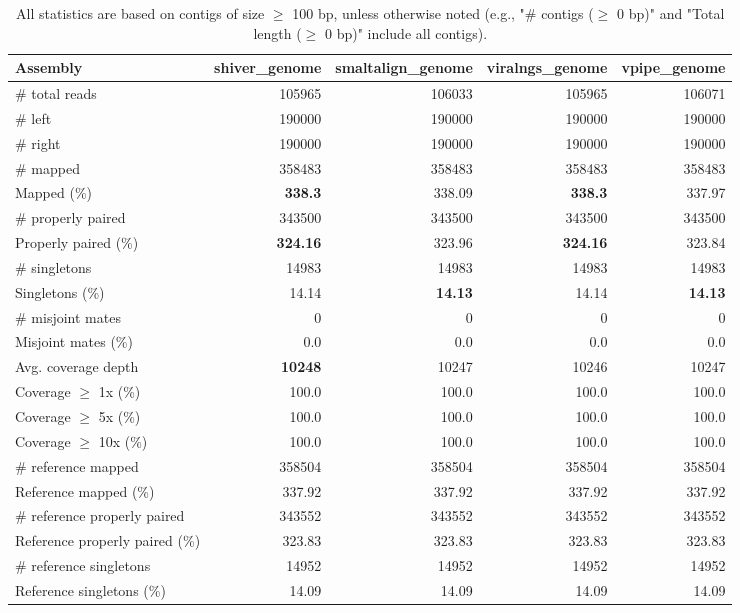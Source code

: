 \documentclass[12pt,a4paper]{article}
\begin{document}
\begin{table}[ht]
\begin{center}
\caption{All statistics are based on contigs of size $\geq$ 100 bp, unless otherwise noted (e.g., "\# contigs ($\geq$ 0 bp)" and "Total length ($\geq$ 0 bp)" include all contigs).}
\begin{tabular}{|l*{4}{|r}|}
\hline
Assembly & shiver\_genome & smaltalign\_genome & viralngs\_genome & vpipe\_genome \\ \hline
\# total reads & 105965 & 106033 & 105965 & 106071 \\ \hline
\# left & 190000 & 190000 & 190000 & 190000 \\ \hline
\# right & 190000 & 190000 & 190000 & 190000 \\ \hline
\# mapped & 358483 & 358483 & 358483 & 358483 \\ \hline
Mapped (\%) & {\bf 338.3} & 338.09 & {\bf 338.3} & 337.97 \\ \hline
\# properly paired & 343500 & 343500 & 343500 & 343500 \\ \hline
Properly paired (\%) & {\bf 324.16} & 323.96 & {\bf 324.16} & 323.84 \\ \hline
\# singletons & 14983 & 14983 & 14983 & 14983 \\ \hline
Singletons (\%) & 14.14 & {\bf 14.13} & 14.14 & {\bf 14.13} \\ \hline
\# misjoint mates & 0 & 0 & 0 & 0 \\ \hline
Misjoint mates (\%) & 0.0 & 0.0 & 0.0 & 0.0 \\ \hline
Avg. coverage depth & {\bf 10248} & 10247 & 10246 & 10247 \\ \hline
Coverage $\geq$ 1x (\%) & 100.0 & 100.0 & 100.0 & 100.0 \\ \hline
Coverage $\geq$ 5x (\%) & 100.0 & 100.0 & 100.0 & 100.0 \\ \hline
Coverage $\geq$ 10x (\%) & 100.0 & 100.0 & 100.0 & 100.0 \\ \hline
\# reference mapped & 358504 & 358504 & 358504 & 358504 \\ \hline
Reference mapped (\%) & 337.92 & 337.92 & 337.92 & 337.92 \\ \hline
\# reference properly paired & 343552 & 343552 & 343552 & 343552 \\ \hline
Reference properly paired (\%) & 323.83 & 323.83 & 323.83 & 323.83 \\ \hline
\# reference singletons & 14952 & 14952 & 14952 & 14952 \\ \hline
Reference singletons (\%) & 14.09 & 14.09 & 14.09 & 14.09 \\ \hline

\end{tabular}
\end{center}
\end{table}
\end{document}
